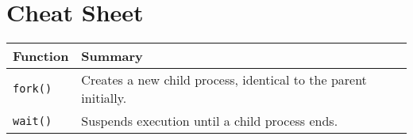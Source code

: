 \documentclass[openany,12pt]{book}
\begin{document}
\part{Cheat Sheet}
\begin{longtable}{|l|p{11cm}|}
  \hline
  \textbf{Function} & \textbf{Summary}                                                \\
  \hline
  \texttt{fork()}   & Creates a new child process, identical to the parent initially. \\
  \texttt{wait()}   & Suspends execution until a child process ends.                  \\
  \hline
\end{longtable}
\end{document}
